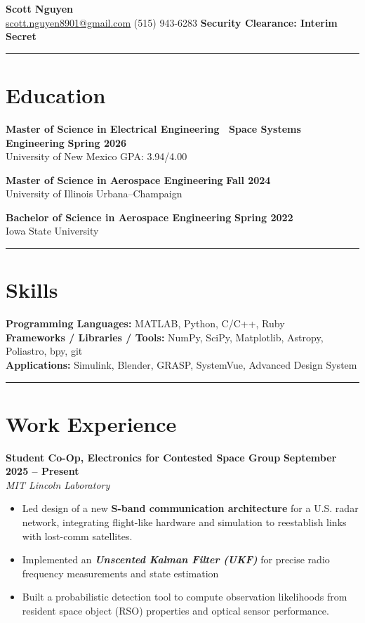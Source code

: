 \documentclass[10pt]{article}
\newcommand{\sectionline}{\noindent\rule{\linewidth}{0.4pt}}
\begin{document}
	
	\begin{center}
		{\color{mygreen}
			{\Huge \textbf{Scott Nguyen}} \\
			\small
			\href{mailto:scott.nguyen8901@gmail.com}{scott.nguyen8901@gmail.com} \textbar
			(515) 943-6283 \textbar
			\textbf{Security Clearance: Interim Secret}
		}
	\end{center}
	
	\sectionline
	
	\section*{Education}
	
	\textbf{Master of Science in Electrical Engineering \textbar\ Space Systems Engineering} \hfill \textbf{Spring 2026} \\
	University of New Mexico \hfill GPA: 3.94/4.00
	
	\textbf{Master of Science in Aerospace Engineering} \hfill \textbf{Fall 2024} \\
	University of Illinois Urbana–Champaign
	
	\textbf{Bachelor of Science in Aerospace Engineering} \hfill \textbf{Spring 2022} \\
	Iowa State University
	
	\sectionline
	
	\section*{Skills}
	\textbf{Programming Languages:} MATLAB, Python, C/C++, Ruby \\
	\textbf{Frameworks / Libraries / Tools:} NumPy, SciPy, Matplotlib, Astropy, Poliastro, bpy, git \\
	\textbf{Applications:} Simulink, Blender, GRASP, SystemVue, Advanced Design System 
	
	\sectionline
	
	\section*{Work Experience}
	
	\textbf{Student Co-Op, Electronics for Contested Space Group} \hfill \textbf{September 2025 – Present} \\
	\emph{MIT Lincoln Laboratory}
	\begin{itemize}
		\item Led design of a new \textbf{S-band communication architecture} for a U.S. radar network, integrating flight-like hardware and simulation to reestablish links with lost-comm satellites.
		\item Implemented an \textbf{\emph{Unscented Kalman Filter (UKF)}} for precise radio frequency measurements and state estimation
		\item Built a probabilistic detection tool to compute observation likelihoods from resident space object (RSO) properties and optical sensor performance.
	\end{itemize}
	
\end{document}
